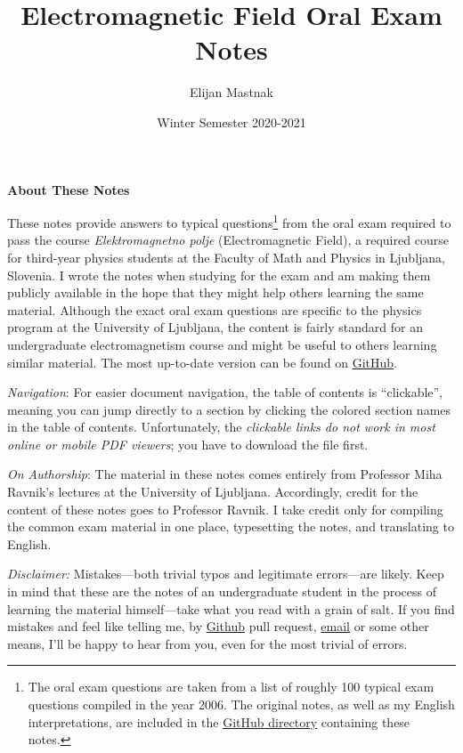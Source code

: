 \documentclass[11pt, a4paper]{article}
\begin{document}
\title{Electromagnetic Field Oral Exam Notes}
\author{Elijan Mastnak}
\date{Winter Semester 2020-2021}
\maketitle

\thispagestyle{empty}  %

\begin{center}
\textbf{About These Notes}
\end{center}
These notes provide answers to typical questions\footnote{The oral exam questions are taken from a list of roughly 100 typical exam questions compiled in the year 2006. The original notes, as well as my English interpretations, are included in the \href{https://github.com/ejmastnak/fmf/tree/main/electromagnetic-field}{\underline{GitHub directory}} containing these notes.} from the oral exam required to pass the course \textit{Elektromagnetno polje} (Electromagnetic Field), a required course for third-year physics students at the Faculty of Math and Physics in Ljubljana, Slovenia. I wrote the notes when studying for the exam and am making them publicly available in the hope that they might help others learning the same material. Although the exact oral exam questions are specific to the physics program at the University of Ljubljana, the content is fairly standard for an undergraduate electromagnetism course and might be useful to others learning similar material. The most up-to-date version can be found on \href{https://github.com/ejmastnak/fmf/tree/main/electromagnetic-field}{\underline{GitHub}}.

\vspace{2mm}
\textit{Navigation}: For easier document navigation, the table of contents is ``clickable'', meaning you can jump directly to a section by clicking the colored section names in the table of contents. Unfortunately, the \textit{clickable links do not work in most online or mobile PDF viewers}; you have to download the file first.

\vspace{2mm}
\textit{On Authorship}: The material in these notes comes entirely from Professor Miha Ravnik's lectures at the University of Ljubljana. Accordingly, credit for the content of these notes goes to Professor Ravnik. I take credit only for compiling the common exam material in one place, typesetting the notes, and translating to English.

\vspace{2mm}
\textit{Disclaimer:} Mistakes---both trivial typos and legitimate errors---are likely. Keep in mind that these are the notes of an undergraduate student in the process of learning the material himself---take what you read with a grain of salt. If you find mistakes and feel like telling me, by \href{https://github.com/ejmastnak/fmf}{Github} pull request, \href{mailto:ejmastnak@gmail.com}{email} or some other means, I'll be happy to hear from you, even for the most trivial of errors.
\end{document}
